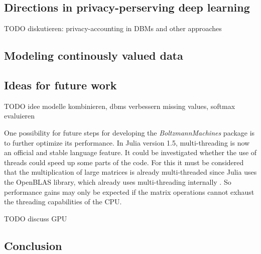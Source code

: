 \documentclass[12pt]{article}
\newcommand{\apkg}[1]{\emph{#1}}
\begin{document}
\subsection{Directions in privacy-perserving deep learning}
TODO diskutieren: privacy-accounting in DBMs and other approaches

\subsection{Modeling continously valued data}

\subsection{Ideas for future work}
TODO idee modelle kombinieren, dbms verbessern missing values, softmax evaluieren


One possibility for future steps for developing the \apkg{BoltzmannMachines} package is to further optimize its performance.
In Julia version 1.5, multi-threading is now an official and stable language feature.
It could be investigated whether the use of threads could speed up some parts of the code.
For this it must be considered that the multiplication of large matrices is already multi-threaded since Julia uses the OpenBLAS library, which already uses multi-threading internally \citep{openblas}.
So performance gains may only be expected if the matrix operations cannot exhaust the threading capabilities of the CPU.

TODO discuss GPU




\subsection{Conclusion}

\clearpage
\appendix
\end{document}
